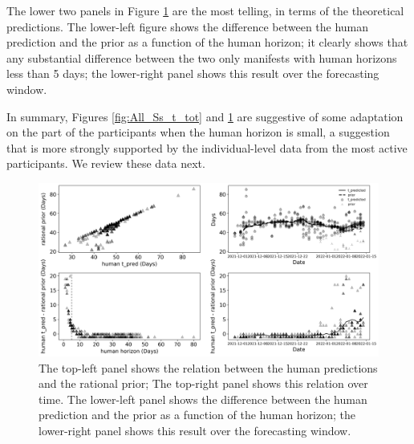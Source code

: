 The lower two panels in Figure \ref{fig:All_S_Scatters} are the most telling, in terms of the theoretical predictions.  The lower-left figure shows the difference between the human prediction and the prior as a function of the human horizon; it clearly shows that any substantial difference between the two only manifests with human horizons less than 5 days; the lower-right panel shows this result over the forecasting window.  

In summary, Figures \ref{fig:All_Ss_t_tot} and \ref{fig:All_S_Scatters} are suggestive of some adaptation on the part of the participants when the human horizon is small, a suggestion that is more strongly supported by the individual-level data from the most active participants.  We review these data next.

\begin{figure}
    \centering
    \includegraphics[width=\linewidth]{Figures/Study1_ExplanatoryScatter_All_S.png}
    \caption{The top-left panel shows the relation between the human predictions and the rational prior; The top-right panel shows this relation over time. The lower-left panel shows the difference between the human prediction and the prior as a function of the human horizon; the lower-right panel shows this result over the forecasting window.}
    \label{fig:All_S_Scatters}
\end{figure}

